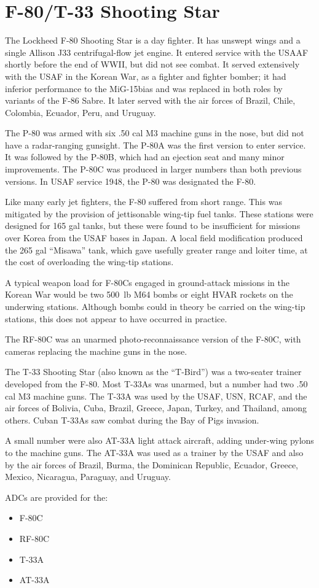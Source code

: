 \section*{F-80/T-33 Shooting Star}

The Lockheed F-80 Shooting Star is a day fighter. It has unswept wings and a single Allison J33 centrifugal-flow jet engine. It entered service with the USAAF shortly before the end of WWII, but did not see combat. It served extensively with the USAF in the Korean War, as a fighter and fighter bomber; it had inferior performance to the MiG-15bias and was replaced in both roles by variants of the F-86 Sabre. It later served with the air forces of Brazil, Chile, Colombia, Ecuador, Peru, and Uruguay.

The P-80 was armed with six .50 cal M3 machine guns in the nose, but did not have a radar-ranging gunsight. The P-80A was the first version to enter service. It was followed by the P-80B, which had an ejection seat and many minor improvements. The P-80C was produced in larger numbers than both previous versions. In USAF service 1948, the P-80 was designated the F-80.

Like many early jet fighters, the F-80 suffered from short range. This was mitigated by the provision of jettisonable wing-tip fuel tanks. These stations were designed for 165 gal tanks, but these were found to be insufficient for missions over Korea from the USAF bases in Japan. A local field modification produced the 265 gal “Misawa” tank, which gave usefully greater range and loiter time, at the cost of overloading the wing-tip stations.

A typical weapon load for F-80Cs engaged in ground-attack missions in the Korean War would be two 500~lb M64 bombs or eight HVAR rockets on the underwing stations. Although bombs could in theory be carried on the wing-tip stations, this does not appear to have occurred in practice.

The RF-80C was an unarmed photo-reconnaissance version of the F-80C, with cameras replacing the machine guns in the nose.

The T-33 Shooting Star (also known as the “T-Bird”) was a two-seater trainer developed from the F-80. Most T-33As was unarmed, but a number had two .50 cal M3 machine guns. The T-33A was used by the USAF, USN, RCAF, and the air forces of Bolivia, Cuba, Brazil, Greece, Japan, Turkey, and Thailand, among others. Cuban T-33As saw combat during the Bay of Pigs invasion.

A small number were also AT-33A light attack aircraft, adding under-wing pylons to the machine guns. The AT-33A was used as a trainer by the USAF and also by the air forces of Brazil, Burma, the Dominican Republic, Ecuador, Greece, Mexico, Nicaragua, Paraguay, and Uruguay.

ADCs are provided for the:
\begin{itemize}
\item F-80C
\item RF-80C
\item T-33A
\item AT-33A
\end{itemize}

